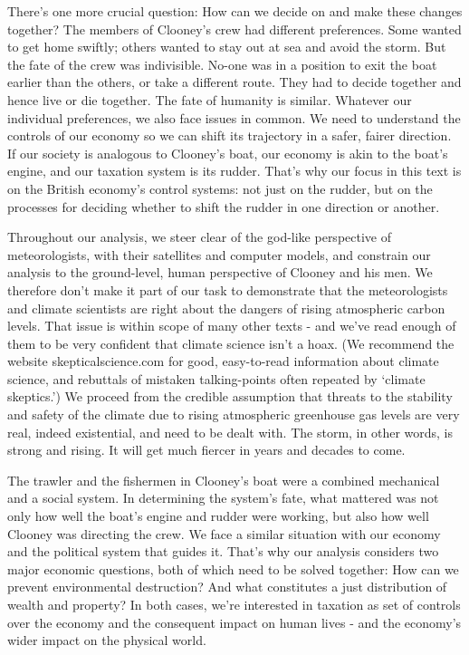 \documentclass[]{tufte-handout}
\begin{document}
There's one more crucial question: How can we decide on and make these
changes together? The members of Clooney's crew had different
preferences. Some wanted to get home swiftly; others wanted to stay out
at sea and avoid the storm. But the fate of the crew was indivisible.
No-one was in a position to exit the boat earlier than the others, or
take a different route. They had to decide together and hence live or
die together. The fate of humanity is similar. Whatever our individual
preferences, we also face issues in common. We need to understand the
controls of our economy so we can shift its trajectory in a safer,
fairer direction. If our society is analogous to Clooney's boat, our
economy is akin to the boat's engine, and our taxation system is its
rudder. That's why our focus in this text is on the British economy's
control systems: not just on the rudder, but on the processes for
deciding whether to shift the rudder in one direction or another.

Throughout our analysis, we steer clear of the god-like perspective of
meteorologists, with their satellites and computer models, and constrain
our analysis to the ground-level, human perspective of Clooney and his
men. We therefore don't make it part of our task to demonstrate that the
meteorologists and climate scientists are right about the dangers of
rising atmospheric carbon levels. That issue is within scope of many
other texts - and we've read enough of them to be very confident that
climate science isn't a hoax. (We recommend the website
skepticalscience.com for good, easy-to-read information about climate
science, and rebuttals of mistaken talking-points often repeated by
`climate skeptics.') We proceed from the credible assumption that
threats to the stability and safety of the climate due to rising
atmospheric greenhouse gas levels are very real, indeed existential, and
need to be dealt with. The storm, in other words, is strong and rising.
It will get much fiercer in years and decades to come.

The trawler and the fishermen in Clooney's boat were a combined
mechanical and a social system. In determining the system's fate, what
mattered was not only how well the boat's engine and rudder were
working, but also how well Clooney was directing the crew. We face a
similar situation with our economy and the political system that guides
it. That's why our analysis considers two major economic questions, both
of which need to be solved together: How can we prevent environmental
destruction? And what constitutes a just distribution of wealth and
property? In both cases, we're interested in taxation as set of controls
over the economy and the consequent impact on human lives - and the
economy's wider impact on the physical world.
\end{document}
